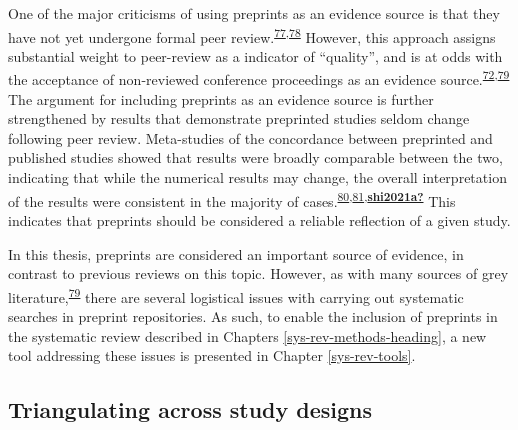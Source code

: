 \documentclass[a4paper, twoside]{templates/ociamthesis}
\begin{document}
One of the major criticisms of using preprints as an evidence source is that they have not yet undergone formal peer review.\textsuperscript{\protect\hyperlink{ref-maslove2018}{77},\protect\hyperlink{ref-schalkwyk2020}{78}} However, this approach assigns substantial weight to peer-review as a indicator of ``quality'', and is at odds with the acceptance of non-reviewed conference proceedings as an evidence source.\textsuperscript{\protect\hyperlink{ref-lefebvre2019searching}{72},\protect\hyperlink{ref-mahood2014}{79}} The argument for including preprints as an evidence source is further strengthened by results that demonstrate preprinted studies seldom change following peer review. Meta-studies of the concordance between preprinted and published studies showed that results were broadly comparable between the two, indicating that while the numerical results may change, the overall interpretation of the results were consistent in the majority of cases.\textsuperscript{\protect\hyperlink{ref-klein2019}{80},\protect\hyperlink{ref-nicholson2021}{81},\protect\hyperlink{ref-shi2021a}{\textbf{shi2021a?}}} This indicates that preprints should be considered a reliable reflection of a given study.

In this thesis, preprints are considered an important source of evidence, in contrast to previous reviews on this topic. However, as with many sources of grey literature,\textsuperscript{\protect\hyperlink{ref-mahood2014}{79}} there are several logistical issues with carrying out systematic searches in preprint repositories. As such, to enable the inclusion of preprints in the systematic review described in Chapters \ref{sys-rev-methods-heading}, a new tool addressing these issues is presented in Chapter \ref{sys-rev-tools}.

\hypertarget{intro-triangulation}{%
\subsection{Triangulating across study designs}\label{intro-triangulation}}
\end{document}
